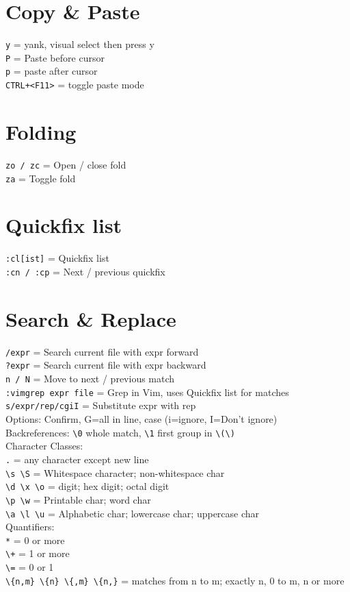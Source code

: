 \documentclass[10pt,DIV=50,landscape,pagesize,parskip=off]{scrartcl}
\newcommand\co[1]{\texttt{#1}}
\newcommand\coe[2]{\co{#1} = #2}
\begin{document}
\begin{multicols}{3}
\section{Copy \& Paste}
\coe{y}{yank, visual select then press y}\\
\coe{P}{Paste before cursor}\\
\coe{p}{paste after cursor}\\
\coe{CTRL+<F11>}{toggle paste mode}

\section{Folding}
\coe{zo / zc}{Open / close fold}\\
\coe{za}{Toggle fold}

\section{Quickfix list}
\coe{:cl[ist]}{Quickfix list}\\
\coe{:cn / :cp}{Next / previous quickfix}

\section{Search \& Replace}
\coe{/expr}{Search current file with expr forward}\\
\coe{?expr}{Search current file with expr backward}\\
\coe{n / N}{Move to next / previous match}\\
\coe{:vimgrep expr file}{Grep in Vim, uses Quickfix list for matches}\\
\coe{s/expr/rep/cgiI}{Substitute expr with rep\\Options: Confirm, G=all in line, case (i=ignore, I=Don't ignore)}\\
Backreferences: \lstinline|\0| whole match, \lstinline|\1| first group in \lstinline|\(\)|\\
Character Classes:\\
\coe{.}{any character except new line}\\
\lstinline|\s \S| = Whitespace character; non-whitespace char\\
\lstinline|\d \x \o| = digit; hex digit; octal digit\\
\lstinline|\p \w| = Printable char; word char\\
\lstinline|\a \l \u| = Alphabetic char; lowercase char; uppercase char\\
Quantifiers:\\
\lstinline|*| = 0 or more\\
\lstinline|\+| = 1 or more\\
\lstinline|\=| = 0 or 1\\
\lstinline|\{n,m} \{n} \{,m} \{n,}| = matches from n to m; exactly n, 0 to m, n or more


\end{multicols}
\end{document}
